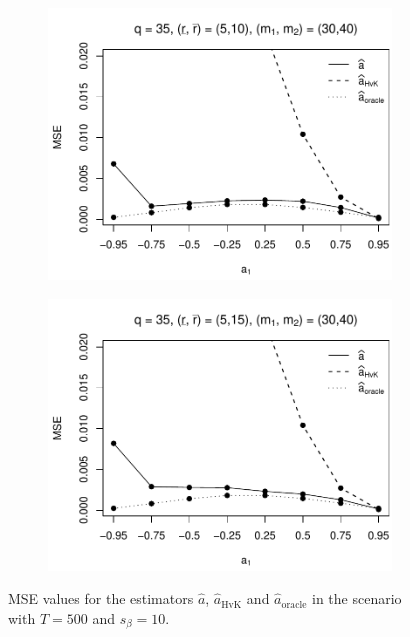 \begin{figure}[p]
\begin{subfigure}[b]{0.45\textwidth}
\includegraphics[width=\textwidth]{Plots/Plots_Supplement/MSE_a_zoom_T=500_slope=10_(L1,L2,K1,K2,M1,M2)=(35,35,5,10,30,40).pdf}
\end{subfigure}
\hspace{0.25cm}
\begin{subfigure}[b]{0.45\textwidth}
\includegraphics[width=\textwidth]{Plots/Plots_Supplement/MSE_a_zoom_T=500_slope=10_(L1,L2,K1,K2,M1,M2)=(35,35,5,15,30,40).pdf}
\end{subfigure}
\caption{MSE values for the estimators $\widehat{a}$, $\widehat{a}_{\text{HvK}}$ and $\widehat{a}_{\text{oracle}}$ in the scenario with $T=500$ and $s_\beta=10$.}\label{fig:MSE_slope10_AR_zoom_robust} 
\end{figure}


